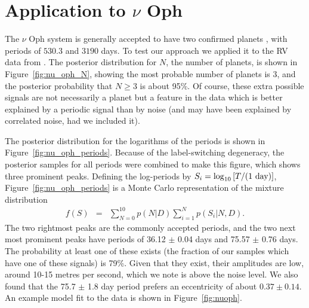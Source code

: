 \documentclass[useAMS,usenatbib]{mn2e}
\begin{document}
\section{Application to $\nu$ Oph}\label{sec:nu_oph}
The $\nu$ Oph system is generally accepted to have two confirmed planets
\citep[e.g.][]{2011AIPC.1331..102Q, 2012PASJ...64..135S, fengji}, with periods
of $530.3$ and $3190$ days. To test our approach we applied it to the RV
data from \citet{2012PASJ...64..135S}.
The posterior distribution for $N$, the number of planets, is shown in
Figure~\ref{fig:nu_oph_N}, showing the most probable number of planets is 3,
and the posterior probability that $N \geq 3$ is about 95\%. Of course, these
extra possible signals are not necessarily a planet but a feature in the data
which is better explained by a periodic signal than by noise (and may have been
explained by correlated noise, had we included it).

The posterior distribution for the logarithms of the periods is shown in
Figure~\ref{fig:nu_oph_periods}. Because of the label-switching degeneracy,
the posterior samples for all periods were combined to make this figure, which
shows three prominent peaks. Defining the log-periods by
$S_i =  \log_{10}\left[T/(\textnormal{1 day})\right]$,
Figure~\ref{fig:nu_oph_periods} is a Monte Carlo representation
of the mixture distribution
\begin{eqnarray}
f(S) &=& \sum_{N=0}^{10} p(N | D)\sum_{i=1}^N p(S_i | N, D).
\end{eqnarray}
The two rightmost peaks are the commonly accepted periods, and the two next
most prominent peaks have periods of 36.12 $\pm$ 0.04 days and
75.57 $\pm$ 0.76 days.
The probability
at least one of these exists (the fraction of our samples which
have one of these signals) is 79\%.
Given that they exist, their amplitudes are low, around 10-15 metres per second,
which we note is above the noise level. We also found that the 75.7 $\pm$ 1.8 day
period prefers an eccentricity of about $0.37 \pm 0.14$.
An example model fit to the data is shown in Figure~\ref{fig:nuoph}.
\end{document}
